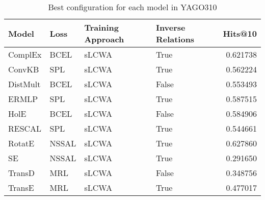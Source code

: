 \begin{table}
\centering
\caption{Best configuration for each model in YAGO310}
\label{best_models_yago310}
\begin{tabular}{llllr}
\toprule
    Model &   Loss & Training Approach & Inverse Relations &   Hits@10 \\
\midrule
  ComplEx &   BCEL &             sLCWA &              True &  0.621738 \\
   ConvKB &    SPL &             sLCWA &              True &  0.562224 \\
 DistMult &   BCEL &             sLCWA &             False &  0.553493 \\
    ERMLP &    SPL &             sLCWA &              True &  0.587515 \\
     HolE &   BCEL &             sLCWA &             False &  0.584906 \\
   RESCAL &    SPL &             sLCWA &              True &  0.544661 \\
   RotatE &  NSSAL &             sLCWA &              True &  0.627860 \\
       SE &  NSSAL &             sLCWA &              True &  0.291650 \\
   TransD &    MRL &             sLCWA &             False &  0.348756 \\
   TransE &    MRL &             sLCWA &              True &  0.477017 \\
\bottomrule
\end{tabular}
\end{table}

